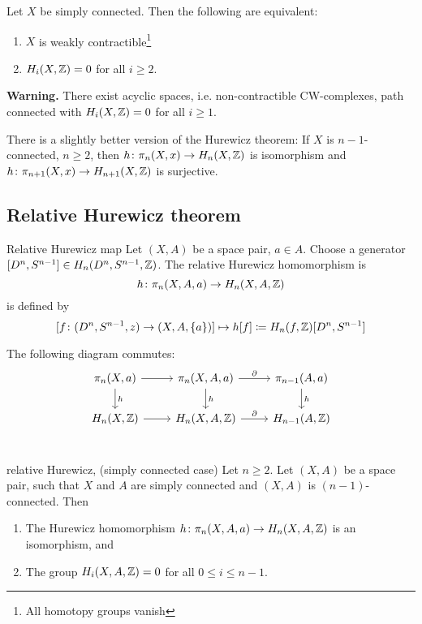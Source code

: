 \documentclass[language=english]{TemplateLecture}
\begin{document}
\begin{proposition}
    Let \(X\) be simply connected. Then the following are equivalent:
    \begin{enumerate}
        \item \(X\) is weakly contractible\footnote{All homotopy groups vanish}
        \item \(H_i(X,\mathbb{Z}) = 0\) for all \(i\geq 2\).
    \end{enumerate}
\end{proposition}

\textbf{Warning.} There exist acyclic spaces, i.e. non-contractible CW-complexes, path connected with \(H_i(X,\mathbb{Z}) = 0\) for all \(i \geq 1\).

\begin{remark}
    There is a slightly better version of the Hurewicz theorem: If \(X\) is \(n-1\)-connected, \(n \geq 2\), then \(h\colon \pi_n(X,x) \to H_n(X, \mathbb{Z})\) is isomorphism and \(h\colon \pi_{n+1}(X,x) \to H_{n+1}(X,\mathbb{Z})\) is surjective.
\end{remark}

\subsection{Relative Hurewicz theorem}

\begin{defi}{Relative Hurewicz map}{}
    Let \((X,A)\) be a space pair, \(a\in A\). Choose a generator \([D^n, S^{n-1}]\in H_n(D^n, S^{n-1}, \mathbb{Z})\). The relative Hurewicz homomorphism is
    \[h\colon \pi_n(X,A, a)\to H_n(X,A,\mathbb{Z})\]
    is defined by
    \[[f\colon (D^n, S^{n-1}, {z})\to (X,A,\{a\})]\mapsto h[f] \coloneq H_n(f, \mathbb{Z})[D^n, S^{n-1}]\]
\end{defi}

The following diagram commutes:
\[\begin{tikzcd}
    \pi_n(X,a) \ar[r]\ar[d, "h"] & \pi_n(X,A, a) \ar[r, "\partial"] \ar[d, "h"] & \pi_{n-1}(A,a)\ar[d, "h"] \\
    H_n(X,\iz) \ar[r] & H_n(X,A,\iz) \ar[r, "\partial"] & H_{n-1}(A,\iz) \\
\end{tikzcd}\]

\begin{thm}{relative Hurewicz, (simply connected case)}{}
    Let \(n\geq 2\). Let \((X,A)\) be a space pair, such that \(X\) and \(A\) are simply connected and \((X,A)\) is \((n-1)\)-connected. Then
    \begin{enumerate}
        \item The Hurewicz homomorphism \(h\colon \pi_n(X,A,a) \to H_n(X,A, \mathbb{Z})\) is an isomorphism, and
        \item The group \(H_i(X,A,\mathbb{Z}) = 0\) for all \(0 \leq i \leq n-1\).
    \end{enumerate}
\end{thm}
\end{document}
